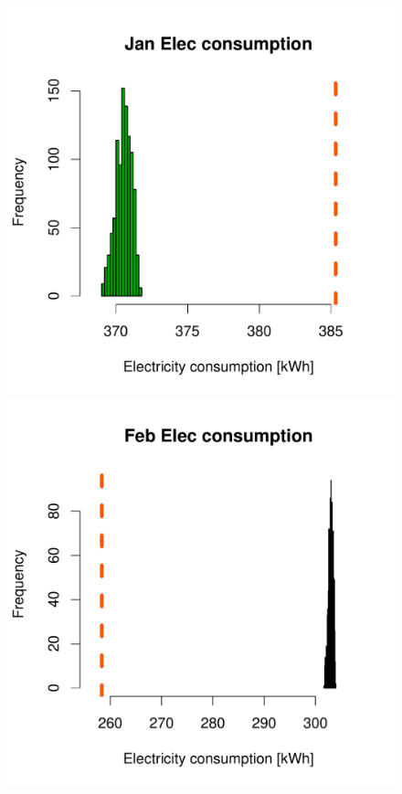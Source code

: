 \documentclass[a4paper, 12pt]{article}
\begin{document}
\begin{figure}
\centering
 \includegraphics[width=\scale]{Simulation_histograms/Batch_2_Only/Elec_Runs/Jan_Elec}
 \includegraphics[width=\scale]{Simulation_histograms/Batch_2_Only/Elec_Runs/Feb_Elec}

\end{figure}
\end{document}
